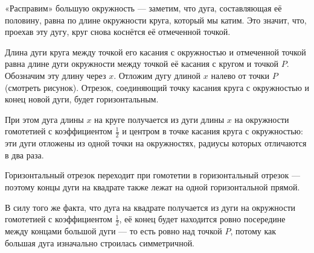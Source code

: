 \begin{itemize}
\itA «Расправим» большую окружность — заметим, что дуга, составляющая её половину, равна по длине окружности круга, который мы катим. Это значит, что, проехав эту дугу, круг снова коснётся её отмеченной точкой.

\begin{center}
\end{center}

\itB Длина дуги круга между точкой его касания с окружностью и отмеченной точкой равна длине дуги окружности между точкой её касания с кругом и точкой $P$. Обозначим эту длину через $x$. Отложим дугу длиной $x$ налево от точки $P$ (смотреть рисунок). Отрезок, соединяющий точку касания круга с окружностью и конец новой дуги, будет горизонтальным.

При этом дуга длины $x$ на круге получается из дуги длины $x$ на окружности гомотетией с коэффициентом $\tfrac{1}{2}$ и центром в точке касания круга с окружностью: эти дуги отложены из одной точки на окружностях, радиусы которых отличаются в два раза.

Горизонтальный отрезок переходит при гомотетии в горизонтальный отрезок — поэтому концы дуги на квадрате также лежат на одной горизонтальной прямой.

\itC В силу того же факта, что дуга на квадрате получается из дуги на окружности гомотетией с коэффициентом $\tfrac{1}{2}$, её конец будет находится ровно посередине между концами большой дуги — то есть ровно над точкой $P$, потому как большая дуга изначально строилась симметричной.
\end{itemize}